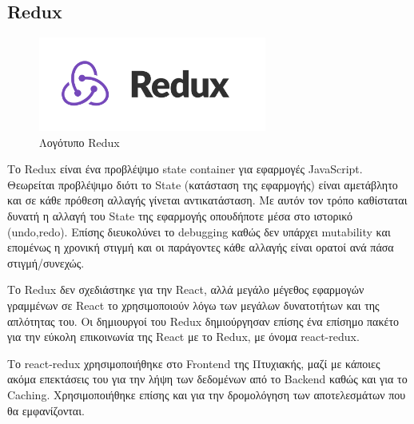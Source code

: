 \subsection{Redux}

\begin{figure}[h]
  \centering
  \includegraphics[width=75mm]{Chapters/3 - Technologies/Images/redux-logo.png}
  \caption{Λογότυπο Redux}
  \label{fig:redux-logo}
\end{figure}

Το Redux είναι ένα προβλέψιμο state container για εφαρμογές JavaScript. Θεωρείται προβλέψιμο διότι το State (κατάσταση της εφαρμογής) είναι αμετάβλητο και σε κάθε πρόθεση αλλαγής γίνεται αντικατάσταση. Με αυτόν τον τρόπο καθίσταται δυνατή η αλλαγή του State της εφαρμογής οπουδήποτε μέσα στο ιστορικό (undo,redo). Επίσης διευκολύνει το debugging καθώς δεν υπάρχει mutability και επομένως η χρονική στιγμή και οι παράγοντες κάθε αλλαγής είναι ορατοί ανά πάσα στιγμή/συνεχώς.

Το Redux δεν σχεδιάστηκε για την React, αλλά μεγάλο μέγεθος εφαρμογών γραμμένων σε React το χρησιμοποιούν λόγω
των μεγάλων δυνατοτήτων και της απλότητας του. Οι δημιουργοί του Redux δημιούργησαν επίσης ένα επίσημο πακέτο για την εύκολη επικοινωνία της React με το Redux, με όνομα react-redux. 

Το react-redux χρησιμοποιήθηκε στο Frontend της Πτυχιακής,
μαζί με κάποιες ακόμα επεκτάσεις του για την λήψη των δεδομένων από το Backend καθώς και για το Caching. Χρησιμοποιήθηκε επίσης και για την δρομολόγηση των αποτελεσμάτων που θα εμφανίζονται.